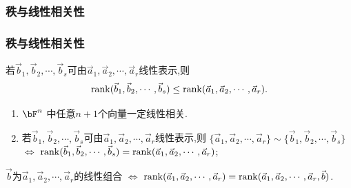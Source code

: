 \subsubsection{秩与线性相关性}
\begin{frame}\frametitle{秩与线性相关性}

\pp
\begin{theorem} 若$\vec{b}_1,\vec{b}_2,\cdots,\vec{b}_s$可由$\vec{a}_1,\vec{a}_2,\cdots,\vec{a}_r$线性表示,则
\[\operatorname{rank}(\vec{b}_1,\vec{b}_2,\cdots,\vec{b}_s)\leq
\operatorname{rank}(\vec{a}_1,\vec{a}_2,\cdots,\vec{a}_r).\]
\end{theorem}
\pp
{}
\pp
\begin{corollary}
\begin{enumerate}
\item $\bF^n$ 中任意$n+1$个向量一定线性相关.
\pp
\item 若$\vec{b}_1,\vec{b}_2,\cdots,\vec{b}_s$可由$\vec{a}_1,\vec{a}_2,\cdots,\vec{a}_r$线性表示,则 $\{\vec{a}_1,\vec{a}_2,\cdots,\vec{a}_r\}\sim\{\vec{b}_1,\vec{b}_2,\cdots,\vec{b}_s\}$ $\Leftrightarrow$ $\operatorname{rank}(\vec{b}_1,\vec{b}_2,\cdots,\vec{b}_s) = \operatorname{rank}(\vec{a}_1,\vec{a}_2,\cdots,\vec{a}_r)$;
\end{enumerate}
\end{corollary}
\pp
\begin{corollary}[用秩来判定线性方程组是否有解]
$\vec{b}$为$\vec{a}_1,\vec{a}_2,\cdots,\vec{a}_r$的线性组合 $\Leftrightarrow$ $\operatorname{rank}(\vec{a}_1,\vec{a}_2,\cdots,\vec{a}_r)=\operatorname{rank}(\vec{a}_1,\vec{a}_2,\cdots,\vec{a}_r,\vec{b})$.
\end{corollary}
\end{frame}





